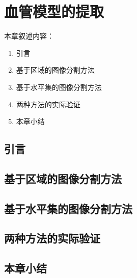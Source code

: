 \chapter{血管模型的提取}
\label{chap3} \fontsize{12pt}{12pt}\selectfont

本章叙述内容：
\begin{enumerate}
  \item 引言
  \item 基于区域的图像分割方法
  \item 基于水平集的图像分割方法
  \item 两种方法的实际验证
  \item 本章小结
\end{enumerate}

\section{引言}

\section{基于区域的图像分割方法}

\section{基于水平集的图像分割方法}

\section{两种方法的实际验证}

\section{本章小结}